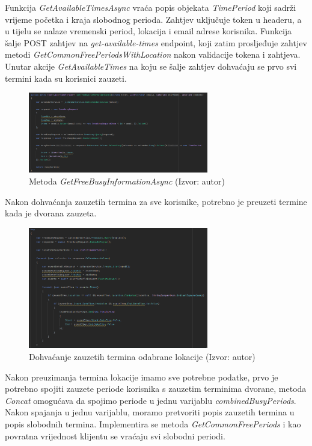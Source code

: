 \documentclass{foi}
\begin{document}
Funkcija \textit{GetAvailableTimesAsync} vraća popis objekata \textit{TimePeriod} koji sadrži vrijeme početka i kraja slobodnog perioda. Zahtjev uključuje token u headeru, a u tijelu se nalaze vremenski period, lokacija i email adrese korisnika. Funkcija šalje POST zahtjev na \textit{get-available-times} endpoint, koji zatim prosljeđuje zahtjev metodi \textit{GetCommonFreePeriodsWithLocation} nakon validacije tokena i zahtjeva.
Unutar akcije \textit{GetAvailableTimes} na koju se šalje zahtjev dohvaćaju se prvo svi termini kada su korisnici zauzeti.
\begin{figure}[H]
    \centering
    \includegraphics[width=0.7\textwidth]{slike/getfreebuisy.png}
    \caption{Metoda \textit{GetFreeBusyInformationAsync} (Izvor: autor)}
    \label{fig:GetFreeBusyInformationAsync}
\end{figure}
Nakon dohvaćanja zauzetih termina za sve korisnike, potrebno je preuzeti termine kada je dvorana zauzeta.
\begin{figure}[H]
    \centering
    \includegraphics[width=0.7\textwidth]{slike/GetBuisyLocation.png}
    \caption{Dohvaćanje zauzetih termina odabrane lokacije (Izvor: autor)}
    \label{fig:GetBuisyLocation}
\end{figure}
Nakon preuzimanja termina lokacije imamo sve potrebne podatke, prvo je potrebno spojiti zauzete periode korisnika s zauzetim terminima dvorane, metoda \textit{Concat} omogućava da spojimo periode u jednu varijablu \textit{combinedBusyPeriods}.
Nakon spajanja u jednu varijablu, moramo pretvoriti popis zauzetih termina u popis slobodnih termina. Implementira se metoda \textit{GetCommonFreePeriods} i kao povratna vrijednost klijentu se vraćaju svi slobodni periodi.
\end{document}
